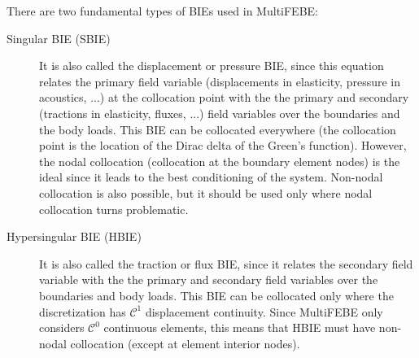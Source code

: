 \documentclass[a4paper,fleqn]{book}
\begin{document}
There are two fundamental types of BIEs used in MultiFEBE:
\begin{description}
    
    \item[Singular BIE (SBIE)] It is also called the displacement or pressure BIE, since this equation relates the primary field variable (displacements in elasticity, pressure in acoustics, ...) at the collocation point with the the primary and secondary (tractions in elasticity, fluxes, ...) field variables over the boundaries and the body loads. This BIE can be collocated everywhere (the collocation point is the location of the Dirac delta of the Green's function). However, the nodal collocation (collocation at the boundary element nodes) is the ideal since it leads to the best conditioning of the system. Non-nodal collocation is also possible, but it should be used only where nodal collocation turns problematic. 
    
    \item[Hypersingular BIE (HBIE)] It is also called the traction or flux BIE, since it relates the secondary field variable with the the primary and secondary field variables over the boundaries and body loads. This BIE can be collocated only where the discretization has $\mathcal{C}^1$ displacement continuity. Since MultiFEBE only considers $\mathcal{C}^0$ continuous elements, this means that HBIE must have non-nodal collocation (except at element interior nodes).
    
\end{description}
\end{document}
